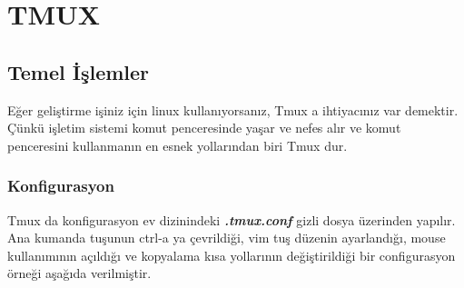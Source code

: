 
%

\chapter{TMUX}

\section{Temel İşlemler}

Eğer geliştirme işiniz için linux kullanıyorsanız, Tmux a ihtiyacınız var demektir. Çünkü işletim sistemi komut penceresinde yaşar ve nefes alır ve komut penceresini kullanmanın en esnek yollarından biri Tmux dur.
\subsection {Konfigurasyon}
Tmux da konfigurasyon ev dizinindeki  \textbf{\emph{.tmux.conf}} gizli dosya üzerinden yapılır. Ana kumanda tuşunun ctrl-a ya çevrildiği, vim tuş düzenin ayarlandığı, mouse kullanımının açıldığı ve kopyalama kısa yollarının değiştirildiği bir configurasyon örneği aşağıda verilmiştir.

%
